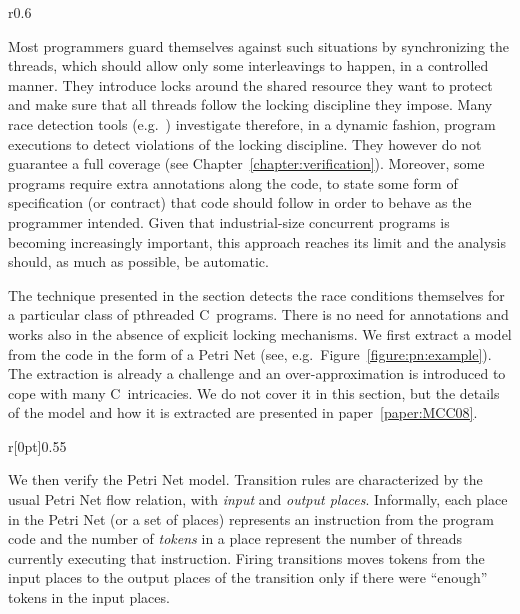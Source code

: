 \noindent%
\begin{wrapfigure}{r}{0.6\linewidth}
  \caption{Critical section as Petri Net.}
  \label{figure:pn:example}
\end{wrapfigure}
%
%
Most programmers guard themselves against such situations by
synchronizing the threads, which should allow only some interleavings
to happen, in a controlled manner.
%
They introduce locks around the shared resource they want to protect
and make sure that all threads follow the locking discipline they
impose.
%
Many race detection tools (e.g.~\cite{Eraser}) investigate therefore,
in a dynamic fashion, program executions to detect violations of the
locking discipline. They however do not guarantee a full coverage (see
Chapter~\ref{chapter:verification}).
%
%
Moreover, some programs require extra annotations along the code, to
state some form of specification (or contract) that code should follow
in order to behave as the programmer intended.
%
Given that industrial-size concurrent programs is becoming
increasingly important, this approach reaches its limit and the
analysis should, as much as possible, be automatic.

The technique presented in the section detects the race conditions
themselves for a particular class of pthreaded C~programs. There is no
need for annotations and works also in the absence of explicit locking
mechanisms.
%
%
We first extract a model from the code in the form of a Petri Net
(see, e.g.\ Figure~\ref{figure:pn:example}).
%
The extraction is already a challenge and an over-approximation is
introduced to cope with many C~intricacies.
%
We do not cover it in this section, but the details of the model and
how it is extracted are presented in paper~\ref{paper:MCC08}.
%

%
\begin{wrapfigure}{r}[0pt]{0.55\linewidth}
  \hfill%
  \caption{Multiset ordering.}
  \label{figure:multiset:ordering}
  \smallskip
\end{wrapfigure}
%
We then verify the Petri Net model.
%
Transition rules are characterized by the usual Petri Net flow
relation, with \emph{input} and \emph{output places}.
%
Informally, each place in the Petri Net (or a set of places)
represents an instruction from the program code and the number of
\emph{tokens} in a place represent the number of threads currently
executing that instruction.
%
Firing transitions moves tokens from the input places to the output
places of the transition only if there were ``enough'' tokens in the
input places.

